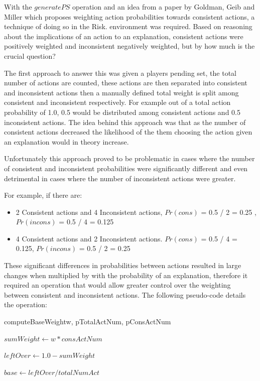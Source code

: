 \documentclass[parskip]{cs4rep}
\begin{document}
With the $generatePS$ operation and an idea from a paper by Goldman, Geib and Miller \cite{Goldman99anew} which proposes weighting action probabilities towards consistent actions, a technique of doing so in the Risk. environment was required. Based on reasoning about the implications of an action to an explanation, consistent actions were positively weighted and inconsistent negatively weighted, but by how much is the crucial question?

The first approach to answer this was given a players pending set, the total number of actions are counted, these actions are then separated into consistent and inconsistent actions then a manually defined total weight is split among consistent and inconsistent respectively. For example out of a total action probability of 1.0, 0.5 would be distributed among consistent actions and 0.5 inconsistent actions. The idea behind this approach was that as the number of consistent actions decreased the likelihood of the them choosing the action given an explanation would in theory increase.

Unfortunately this approach proved to be problematic in cases where the number of consistent and inconsistent probabilities were significantly different and even detrimental in cases where the number of inconsistent actions were greater. 

For example, if there are:

\begin{itemize}
\item
2 Consistent actions and 4 Inconsistent actions, $Pr(cons)$ = 0.5 / 2 = 0.25 , $Pr(incons)$ = 0.5 / 4 = 0.125 
\item
4 Consistent actions and 2 Inconsistent actions. $Pr(cons)$ = 0.5 / 4 = 0.125, $Pr(incons)$ = 0.5 / 2 = 0.25
\end{itemize}

These significant differences in probabilities between actions resulted in large changes when multiplied by with the probability of an explanation, therefore it required an operation that would allow greater control over the weighting between consistent and inconsistent actions. The following pseudo-code details the operation:

\begin{pseudocode}[ruled]{computeBaseWeight}{w, pTotalActNum, pConsActNum}
\begin{algorithm}[H]

$sumWeight \gets w * consActNum$

$leftOver \gets 1.0 - sumWeight$

$base \gets leftOver / totalNumAct$

\end{algorithm}
\end{pseudocode}
\end{document}
